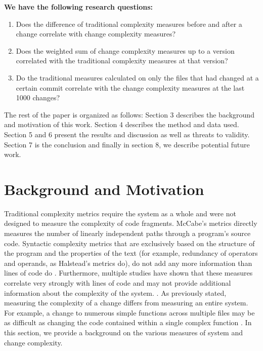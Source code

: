 \documentclass[9pt,twocolumn,a4paper]{article}
\begin{document}
\textbf{We have the following research questions:}

\begin{enumerate}

\item Does the difference of traditional complexity measures before and after a change correlate with change complexity measures?

\item Does the weighted sum of change complexity measures up to a version correlated with the traditional complexity measures at that version? 

\item Do the traditional measures calculated on only the files that had changed at a certain commit correlate with the change complexity measures at the last 1000 changes?

\end{enumerate}

The rest of the paper is organized as follows: Section 3 describes the background and motivation of this work. Section 4 describes the method and data used. Section 5 and 6 present the results and discussion as well as threats to validity. Section 7 is the conclusion and finally in section 8, we describe potential future work.

\section{Background and Motivation}

Traditional complexity metrics require the system as a whole and were not designed to measure the complexity of code fragments. McCabe's metrics directly measures the number of linearly independent paths through a program's source code. Syntactic complexity metrics that are exclusively based on the structure of the program and the properties of the text (for example, redundancy of operators and operands, as Halstead's metrics do), do not add any more information than lines of code do \cite {Israel}. Furthermore, multiple studies have shown that these measures correlate very strongly with lines of code and may not provide additional information about the complexity of the system. \cite {Graves, Leszak, Herraiz}.
As previously stated, measuring the complexity of a change differs from measuring an entire system. For example, a change to numerous simple functions across multiple files may be as difficult as changing the code contained within a single complex function \cite{Peter}.
In this section, we provide a background on the various measures of system and change complexity.
\end{document}
